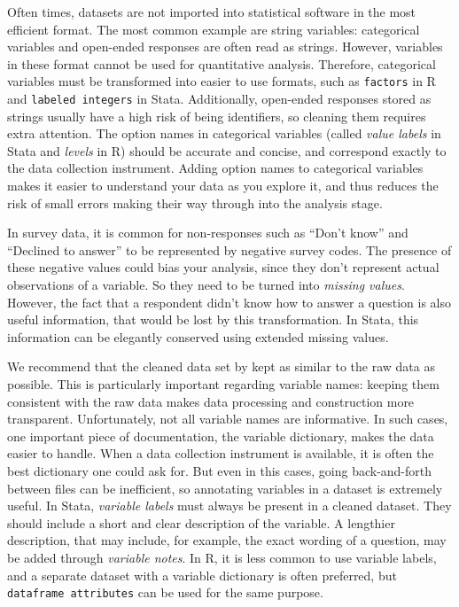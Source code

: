 \begin{fullwidth}
Often times, datasets are not imported into statistical software in the most efficient format.
The most common example are string variables:
categorical variables and open-ended responses are often read as strings.
However, variables in these format cannot be used for quantitative analysis.
Therefore, categorical variables must be transformed into easier to use formats,
such as \texttt{factors} in R and \texttt{labeled integers} in Stata.
Additionally, open-ended responses stored as strings usually have a high risk of being identifiers, 
so cleaning them requires extra attention.
The option names in categorical variables
(called \textit{value labels} in Stata and \textit{levels} in R)
should be accurate and concise, 
and correspond exactly to the data collection instrument.
Adding option names to categorical variables 
makes it easier to understand your data as you explore it,
and thus reduces the risk of small errors making their way through into the analysis stage.

In survey data, it is common for non-responses such as ``Don't know'' and ``Declined to answer''
to be represented by negative survey codes. 
The presence of these negative values could bias your analysis,
since they don't represent actual observations of a variable.
So they need to be turned into \textit{missing values}.
However, the fact that a respondent didn't know how to answer a question is also useful information,
that would be lost by this transformation.
In Stata, this information can be elegantly conserved using extended missing values.

We recommend that the cleaned data set by kept as similar to the raw data as possible.
This is particularly important regarding variable names:
keeping them consistent with the raw data makes data processing and construction more transparent.
Unfortunately, not all variable names are informative.
In such cases, one important piece of documentation,
the variable dictionary, makes the data easier to handle.
When a data collection instrument is available, 
it is often the best dictionary one could ask for.
But even in this cases, going back-and-forth between files can be inefficient,
so annotating variables in a dataset is extremely useful.
In Stata, \textit{variable labels} must always be present in a cleaned dataset.
They should include a short and clear description of the variable.
A lengthier description, that may include, for example,
the exact wording of a question, may be added through \textit{variable notes}.
In R, it is less common to use variable labels,
and a separate dataset with a variable dictionary is often preferred,
but \texttt{dataframe attributes} can be used for the same purpose.


\end{fullwidth}
